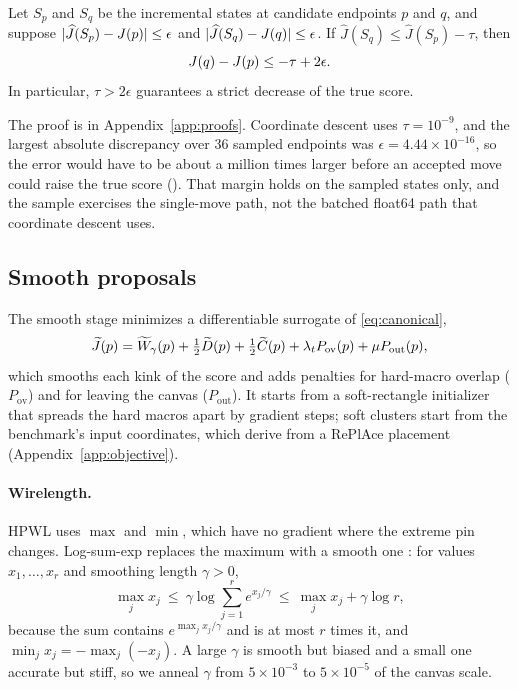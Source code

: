 \begin{proposition}\label{prop:acceptance}
Let $S_p$ and $S_q$ be the incremental states at candidate endpoints $p$ and $q$,
and suppose $|\widehat J(S_p)-J(p)|\le\epsilon$ and
$|\widehat J(S_q)-J(q)|\le\epsilon$. If $\widehat J(S_q)\le\widehat J(S_p)-\tau$,
then
\begin{equation}
 J(q)-J(p)\le-\tau+2\epsilon.
 \label{eq:acceptance-error}
\end{equation}
In particular, $\tau>2\epsilon$ guarantees a strict decrease of the true score.
\end{proposition}
\noindent The proof is in Appendix~\ref{app:proofs}. Coordinate descent uses
$\tau=10^{-9}$, and the largest absolute discrepancy over 36 sampled endpoints was
$\epsilon=4.44\times10^{-16}$, so the error would have to be about a million times
larger before an accepted move could raise the true score (\measurement). That margin
holds on the sampled states only, and the sample exercises the single-move path, not
the batched float64 path that coordinate descent uses.

\subsection{Smooth proposals}\label{sec:smooth}

The smooth stage minimizes a differentiable surrogate of \eqref{eq:canonical},
\begin{equation}
\widetilde{J}(p)=\widetilde W_\gamma(p)+\tfrac12\widetilde D(p)+\tfrac12\widetilde C(p)
 +\lambda_t P_{\mathrm{ov}}(p)+\mu P_{\mathrm{out}}(p),
\label{eq:surrogate}
\end{equation}
which smooths each kink of the score and adds penalties for hard-macro overlap
($P_{\mathrm{ov}}$) and for leaving the canvas ($P_{\mathrm{out}}$). It starts from a
soft-rectangle initializer that spreads the hard macros apart by gradient steps; soft
clusters start from the benchmark's input coordinates, which derive from a RePlAce
placement (Appendix~\ref{app:objective}).

\paragraph{Wirelength.} HPWL uses $\max$ and $\min$, which have no gradient where the
extreme pin changes. Log-sum-exp replaces the maximum with a smooth one
\citep{naylor2001lse}: for values $x_1,\dots,x_r$ and smoothing length $\gamma>0$,
\begin{equation}
 \max_j x_j\ \le\ \gamma\log\sum_{j=1}^r e^{x_j/\gamma}\ \le\ \max_j x_j+\gamma\log r,
 \label{eq:lse}
\end{equation}
because the sum contains $e^{\max_j x_j/\gamma}$ and is at most $r$ times it, and
$\min_j x_j=-\max_j(-x_j)$. A large $\gamma$ is smooth but biased and a small one
accurate but stiff, so we anneal $\gamma$ from $5\times10^{-3}$ to $5\times10^{-5}$
of the canvas scale.

